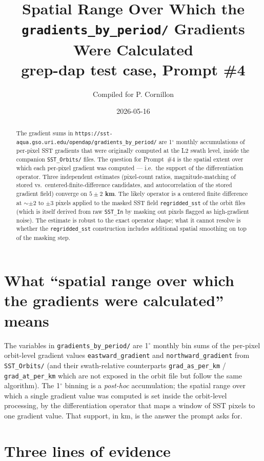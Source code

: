 \documentclass[11pt]{article}
\title{Spatial Range Over Which the \texttt{gradients\_by\_period/}
       Gradients Were Calculated\\
       \large grep-dap test case, Prompt \#4}
\author{Compiled for P. Cornillon}
\date{2026-05-16}
\begin{document}
\maketitle

\begin{abstract}
The gradient sums in
\texttt{https://sst-aqua.gso.uri.edu/opendap/gradients\_by\_period/}
are 1$^\circ$ monthly accumulations of per-pixel SST gradients that
were originally computed at the L2 swath level, inside the
companion \texttt{SST\_Orbits/} files. The question for Prompt~\#4
is the spatial extent over which each per-pixel gradient was
computed --- i.e.\ the support of the differentiation operator.
Three independent estimates (pixel-count ratios, magnitude-matching
of stored vs.\ centered-finite-difference candidates, and
autocorrelation of the stored gradient field) converge on
\textbf{$5 \pm 2$ km}. The likely operator is a centered
finite difference at $\sim\pm 2$ to $\pm 3$ pixels applied to the
masked SST field \texttt{regridded\_sst} of the orbit files
(which is itself derived from raw \texttt{SST\_In} by masking out
pixels flagged as high-gradient noise). The estimate is robust to
the exact operator shape; what it cannot resolve is whether the
\texttt{regridded\_sst} construction includes additional spatial
smoothing on top of the masking step.
\end{abstract}

\tableofcontents

\section{What ``spatial range over which the gradients were
calculated'' means}\label{sec:question}

The variables in \texttt{gradients\_by\_period/} are 1$^\circ$
monthly bin sums of the per-pixel orbit-level gradient values
\texttt{eastward\_gradient} and \texttt{northward\_gradient} from
\texttt{SST\_Orbits/} (and their swath-relative counterparts
\texttt{grad\_as\_per\_km} / \texttt{grad\_at\_per\_km} which are
not exposed in the orbit file but follow the same algorithm). The
1$^\circ$ binning is a \emph{post-hoc} accumulation; the spatial
range over which a single gradient value was computed is set
inside the orbit-level processing, by the differentiation operator
that maps a window of SST pixels to one gradient value. That
support, in km, is the answer the prompt asks for.

\section{Three lines of evidence}\label{sec:evidence}
\end{document}
